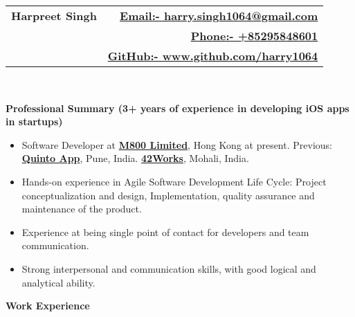 \documentclass[letterpaper,11pt]{article}
\newcommand{\resitem}[1]{\item #1 \vspace{-2pt}}
\newcommand{\resheading}[1]{{\large \colorbox{mygrey}{\begin{minipage}{\textwidth}{\textbf{#1 \vphantom{p\^{E}}}}\end{minipage}}}}
\begin{document}
\newcommand{\mywebheader}{
\begin{tabular*}{7in}{l@{\extracolsep{\fill}}r}
	\textbf{\Huge \bfseries Harpreet Singh} 
	& \href{mailto:harry.singh1064@gmail.com}{\normalsize \bfseries Email:- \mdseries harry.singh1064@gmail.com}\\
	 & \href{tel:+85295848601}{\normalsize \bfseries Phone:- \mdseries +85295848601}\\
	 & \href{https://github.com/harry1064}{\normalsize \bfseries GitHub:- \mdseries www.github.com/harry1064}\\
	\end{tabular*}
\\}
\mywebheader

\resheading{\Large Professional Summary \normalsize \bfseries (3+ years of experience in developing iOS apps in startups)}
{ \footnotesize
\begin{itemize}
	\resitem{Software Developer at 
	\href{https://www.m800.com/}{\bfseries M800 Limited}, Hong Kong at present. Previous: \href{http://quintoapp.com}{\bfseries Quinto App}, Pune, India.
	\linebreak \href{http://42works.net/} {\bfseries  42Works}, Mohali, India. }
	\resitem{Hands-on experience in Agile Software Development Life Cycle: Project conceptualization and design, Implementation,
quality assurance and maintenance of the product.}
	\resitem{Experience at being single point of contact for developers and team communication.}
	\resitem{Strong interpersonal and communication skills, with good logical and analytical ability.}
\end{itemize}
} %
\vspace{5mm} 
\resheading{Work Experience}
\end{document}
